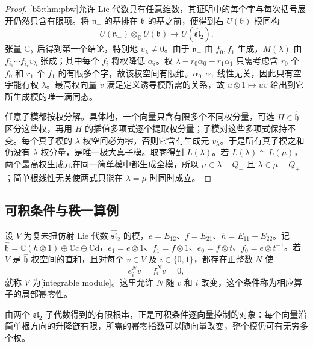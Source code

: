 \begin{proof}
	\cref{b5:thm:pbw}允许 Lie 代数具有任意维数，其证明中的每个字与每次括号展开仍然只含有限项。将 \(\mathfrak n_-\) 的基排在 \(\mathfrak b\) 的基之前，便得到右 \(U(\mathfrak b)\) 模同构
	\[
		U(\mathfrak n_-)\otimes_{\mathbb C}U(\mathfrak b)
		\longrightarrow U(\widehat{\mathfrak{sl}}_2).
	\]
	张量 \(\mathbb C_\lambda\) 后得到第一个结论，特别地 \(v_\lambda\ne0\)。由于 \(\mathfrak n_-\) 由 \(f_0,f_1\) 生成，\(M(\lambda)\) 由 \(f_{i_1}\cdots f_{i_r}v_\lambda\) 张成；其中每个 \(f_i\) 将权降低 \(\alpha_i\)。权 \(\lambda-r_0\alpha_0-r_1\alpha_1\) 只需考虑含 \(r_0\) 个 \(f_0\) 和 \(r_1\) 个 \(f_1\) 的有限多个字，故该权空间有限维。\(\alpha_0,\alpha_1\) 线性无关，因此只有空字能有权 \(\lambda\)。最高权向量 \(v\) 满足定义诱导模所需的关系，故 \(u\otimes1\mapsto uv\) 给出到它所生成模的唯一满同态。

	任意子模都按权分解。具体地，一个向量只含有限多个不同权分量，可选 \(H\in\widehat{\mathfrak h}\) 区分这些权，再用 \(H\) 的插值多项式逐个提取权分量；子模对这些多项式保持不变。每个真子模的 \(\lambda\) 权空间必为零，否则它含有生成元 \(v_\lambda\)。于是所有真子模之和仍没有 \(\lambda\) 权分量，是唯一极大真子模。取商得到 \(L(\lambda)\)。若 \(L(\lambda)\cong L(\mu)\)，两个最高权生成元在同一简单模中都生成全模，所以 \(\mu\in\lambda-Q_+\) 且 \(\lambda\in\mu-Q_+\)；简单根线性无关使两式只能在 \(\lambda=\mu\) 时同时成立。
\end{proof}

\subsection{可积条件与秩一算例}
\label{b5:subsec:G03:03}

\begin{definition}\label{b5:def:G-integrable-module}
	设 \(V\) 为复未扭仿射 Lie 代数 \(\widehat{\mathfrak{sl}}_2\) 的模，\(e=E_{12}\)、\(f=E_{21}\)、\(h=E_{11}-E_{22}\)。记 \(\widehat{\mathfrak h}=\mathbb C(h\otimes1)\oplus\mathbb Cc\oplus\mathbb C\mathrm d\)，\(e_1=e\otimes1\)、\(f_1=f\otimes1\)、\(e_0=f\otimes t\)、\(f_0=e\otimes t^{-1}\)。若 \(V\) 是 \(\widehat{\mathfrak h}\) 权空间的直和，且对每个 \(v\in V\) 及 \(i\in\{0,1\}\)，都存在正整数 \(N\) 使
	\[
		e_i^Nv=f_i^Nv=0,
	\]
	就称 \(V\) 为[integrable module]。这里允许 \(N\) 随 \(v\) 和 \(i\) 改变，这个条件称为相应算子的局部幂零性。
\end{definition}
由两个 \(\mathfrak{sl}_2\) 子代数得到的有限根串，正是可积条件逐向量控制的对象：每个向量沿简单根方向的升降链有限，所需的幂零指数可以随向量改变，整个模仍可有无穷多个权。

